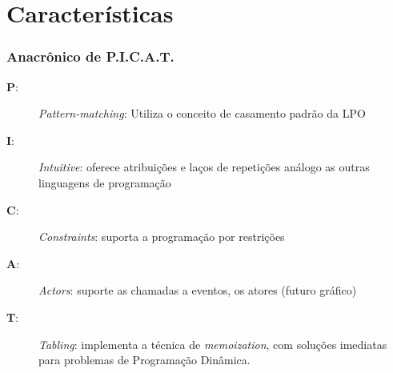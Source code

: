 \documentclass[10pt]{beamer}
\begin{document}
\section{Características}
\begin{frame}
    \frametitle{Anacrônico de \textbf{P.I.C.A.T.}}
  
 \begin{description}
   
 
 \item [\textbf{P}:] \textit{Pattern-matching}:  Utiliza o conceito de casamento padrão da LPO
 
 \item [\textbf{I}:] \textit{Intuitive}: oferece atribuições e laços de repetições análogo as outras linguagens de programação
 
  \item [\textbf{C}:] \textit{Constraints}: suporta a programação por restrições
 
     \item [\textbf{A}:] \textit{Actors}: suporte as chamadas a eventos, os atores (futuro gráfico) 
 
  \item [\textbf{T}:] \textit{Tabling}: implementa a técnica de \textit{memoization}, com soluções imediatas para problemas de Programação Dinâmica.
   
  
\end{description}
\end{frame}


\end{document}
